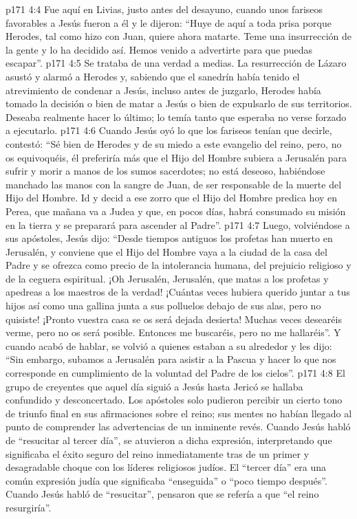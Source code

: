 \vs p171 4:4 \pc Fue aquí en Livias, justo antes del desayuno, cuando unos fariseos favorables a Jesús fueron a él y le dijeron: “Huye de aquí a toda prisa porque Herodes, tal como hizo con Juan, quiere ahora matarte. Teme una insurrección de la gente y lo ha decidido así. Hemos venido a advertirte para que puedas escapar”.
\vs p171 4:5 Se trataba de una verdad a medias. La resurrección de Lázaro asustó y alarmó a Herodes y, sabiendo que el sanedrín había tenido el atrevimiento de condenar a Jesús, incluso antes de juzgarlo, Herodes había tomado la decisión o bien de matar a Jesús o bien de expulsarlo de sus territorios. Deseaba realmente hacer lo último; lo temía tanto que esperaba no verse forzado a ejecutarlo.
\vs p171 4:6 Cuando Jesús oyó lo que los fariseos tenían que decirle, contestó: “Sé bien de Herodes y de su miedo a este evangelio del reino, pero, no os equivoquéis, él preferiría más que el Hijo del Hombre subiera a Jerusalén para sufrir y morir a manos de los sumos sacerdotes; no está deseoso, habiéndose manchado las manos con la sangre de Juan, de ser responsable de la muerte del Hijo del Hombre. Id y decid a ese zorro que el Hijo del Hombre predica hoy en Perea, que mañana va a Judea y que, en pocos días, habrá consumado su misión en la tierra y se preparará para ascender al Padre”.
\vs p171 4:7 Luego, volviéndose a sus apóstoles, Jesús dijo: “Desde tiempos antiguos los profetas han muerto en Jerusalén, y conviene que el Hijo del Hombre vaya a la ciudad de la casa del Padre y se ofrezca como precio de la intolerancia humana, del prejuicio religioso y de la ceguera espiritual. ¡Oh Jerusalén, Jerusalén, que matas a los profetas y apedreas a los maestros de la verdad! ¡Cuántas veces hubiera querido juntar a tus hijos así como una gallina junta a sus polluelos debajo de sus alas, pero no quisiste! ¡Pronto vuestra casa se os será dejada desierta! Muchas veces desearéis verme, pero no os será posible. Entonces me buscaréis, pero no me hallaréis”. Y cuando acabó de hablar, se volvió a quienes estaban a su alrededor y les dijo: “Sin embargo, subamos a Jerusalén para asistir a la Pascua y hacer lo que nos corresponde en cumplimiento de la voluntad del Padre de los cielos”.
\vs p171 4:8 \pc El grupo de creyentes que aquel día siguió a Jesús hasta Jericó se hallaba confundido y desconcertado. Los apóstoles solo pudieron percibir un cierto tono de triunfo final en sus afirmaciones sobre el reino; sus mentes no habían llegado al punto de comprender las advertencias de un inminente revés. Cuando Jesús habló de “resucitar al tercer día”, se atuvieron a dicha expresión, interpretando que significaba el éxito seguro del reino inmediatamente tras de un primer y desagradable choque con los líderes religiosos judíos. El “tercer día” era una común expresión judía que significaba “enseguida” o “poco tiempo después”. Cuando Jesús habló de “resucitar”, pensaron que se refería a que “el reino resurgiría”.
